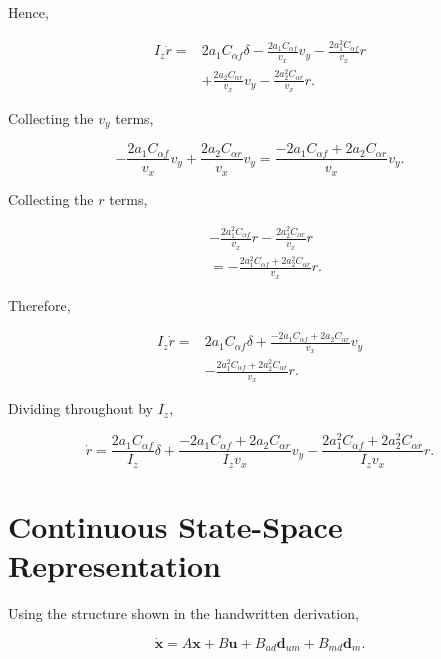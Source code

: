 \documentclass[12pt,a4paper]{article}
\begin{document}
Hence,

\begin{align}
I_z\dot r
={}&
2a_1C_{\alpha f}\delta
-
\frac{2a_1C_{\alpha f}}{v_x}v_y
-
\frac{2a_1^2C_{\alpha f}}{v_x}r
\nonumber\\
&+
\frac{2a_2C_{\alpha r}}{v_x}v_y
-
\frac{2a_2^2C_{\alpha r}}{v_x}r.
\end{align}

Collecting the $v_y$ terms,

\begin{equation}
-\frac{2a_1C_{\alpha f}}{v_x}v_y
+
\frac{2a_2C_{\alpha r}}{v_x}v_y
=
\frac{-2a_1C_{\alpha f}+2a_2C_{\alpha r}}
{v_x}v_y.
\end{equation}

Collecting the $r$ terms,

\begin{align}
&
-\frac{2a_1^2C_{\alpha f}}{v_x}r
-
\frac{2a_2^2C_{\alpha r}}{v_x}r
\nonumber\\
&=
-\frac{
2a_1^2C_{\alpha f}
+
2a_2^2C_{\alpha r}
}{v_x}r.
\end{align}

Therefore,

\begin{align}
I_z\dot r
={}&
2a_1C_{\alpha f}\delta
+
\frac{-2a_1C_{\alpha f}+2a_2C_{\alpha r}}
{v_x}v_y
\nonumber\\
&-
\frac{
2a_1^2C_{\alpha f}
+
2a_2^2C_{\alpha r}
}{v_x}r.
\end{align}

Dividing throughout by $I_z$,

\begin{equation}
\boxed{
\dot r
=
\frac{2a_1C_{\alpha f}}{I_z}\delta
+
\frac{-2a_1C_{\alpha f}+2a_2C_{\alpha r}}
{I_zv_x}v_y
-
\frac{
2a_1^2C_{\alpha f}
+
2a_2^2C_{\alpha r}
}
{I_zv_x}r
}.
\end{equation}

\section{Continuous State-Space Representation}

Using the structure shown in the handwritten derivation,

\begin{equation}
\boxed{
\dot{\bm{x}}
=
A\bm{x}
+
B\bm{u}
+
B_{ud}\bm{d}_{um}
+
B_{md}\bm{d}_m
}.
\end{equation}
\end{document}
